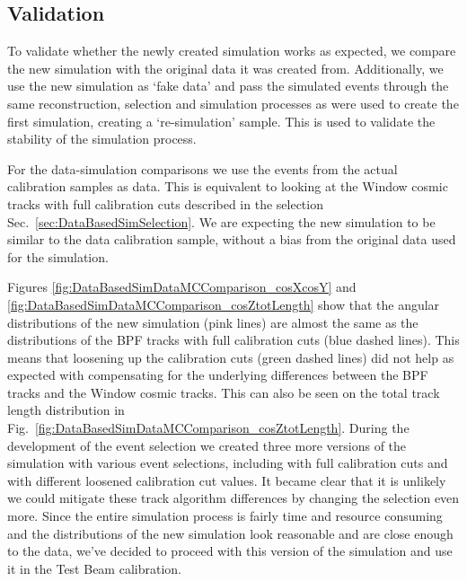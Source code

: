 \subsection{Validation}
To validate whether the newly created simulation works as expected, we compare the new simulation with the original data it was created from. Additionally, we use the new simulation as `fake data' and pass the simulated events through the same reconstruction, selection and simulation processes as were used to create the first simulation, creating a `re-simulation' sample. This is used to validate the stability of the simulation process.

For the data-simulation comparisons we use the events from the actual calibration samples as data. This is equivalent to looking at the Window cosmic tracks with full calibration cuts described in the selection Sec.~\ref{sec:DataBasedSimSelection}. We are expecting the new simulation to be similar to the data calibration sample, without a bias from the original data used for the simulation.

Figures \ref{fig:DataBasedSimDataMCComparison_cosXcosY} and \ref{fig:DataBasedSimDataMCComparison_cosZtotLength} show that the angular distributions of the new simulation (pink lines) are almost the same as the distributions of the \gls{BPF} tracks with full calibration cuts (blue dashed lines). This means that loosening up the calibration cuts (green dashed lines) did not help as expected with compensating for the underlying differences between the \gls{BPF} tracks and the Window cosmic tracks. This can also be seen on the total track length distribution in Fig.~\ref{fig:DataBasedSimDataMCComparison_cosZtotLength}. During the development of the event selection we created three more versions of the simulation with various event selections, including with full calibration cuts and with different loosened calibration cut values. It became clear that it is unlikely we could mitigate these track algorithm differences by changing the selection even more. Since the entire simulation process is fairly time and resource consuming and the distributions of the new simulation look reasonable and are close enough to the data, we've decided to proceed with this version of the simulation and use it in the Test Beam calibration.

